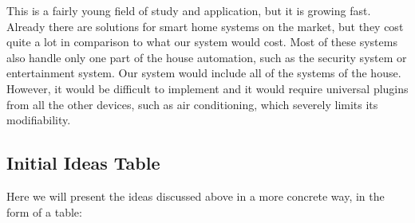 \documentclass[../document.tex]{subfiles}
\begin{document}
This is a fairly young field of study and application, but it is growing fast. Already there are solutions for smart home systems on the market, but they cost quite a lot in comparison to what our system would cost. Most of these systems also handle only one part of the house automation, such as the security system or entertainment system. Our system would include all of the systems of the house. However, it would be difficult to implement and it would require universal plugins from all the other devices, such as air conditioning, which severely limits its modifiability.

\subsection*{Initial Ideas Table}
Here we will present the ideas discussed above in a more concrete way, in the form of a table:
\end{document}
